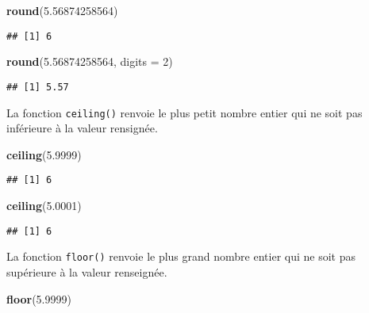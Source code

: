 \documentclass[]{book}
\newenvironment{Shaded}{\begin{snugshade}}{\end{snugshade}}
\newcommand{\KeywordTok}[1]{\textcolor[rgb]{0.13,0.29,0.53}{\textbf{#1}}}
\newcommand{\DataTypeTok}[1]{\textcolor[rgb]{0.13,0.29,0.53}{#1}}
\newcommand{\DecValTok}[1]{\textcolor[rgb]{0.00,0.00,0.81}{#1}}
\newcommand{\FloatTok}[1]{\textcolor[rgb]{0.00,0.00,0.81}{#1}}
\newcommand{\NormalTok}[1]{#1}
\theoremstyle{definition}
\theoremstyle{definition}
\theoremstyle{definition}
\theoremstyle{remark}
\begin{document}
\begin{Shaded}
\begin{Highlighting}[]
\KeywordTok{round}\NormalTok{(}\FloatTok{5.56874258564}\NormalTok{)}
\end{Highlighting}
\end{Shaded}

\begin{verbatim}
## [1] 6
\end{verbatim}

\begin{Shaded}
\begin{Highlighting}[]
\KeywordTok{round}\NormalTok{(}\FloatTok{5.56874258564}\NormalTok{, }\DataTypeTok{digits =} \DecValTok{2}\NormalTok{)}
\end{Highlighting}
\end{Shaded}

\begin{verbatim}
## [1] 5.57
\end{verbatim}

La fonction \texttt{ceiling()} renvoie le plus petit nombre entier qui
ne soit pas inférieure à la valeur rensignée.

\begin{Shaded}
\begin{Highlighting}[]
\KeywordTok{ceiling}\NormalTok{(}\FloatTok{5.9999}\NormalTok{)}
\end{Highlighting}
\end{Shaded}

\begin{verbatim}
## [1] 6
\end{verbatim}

\begin{Shaded}
\begin{Highlighting}[]
\KeywordTok{ceiling}\NormalTok{(}\FloatTok{5.0001}\NormalTok{)}
\end{Highlighting}
\end{Shaded}

\begin{verbatim}
## [1] 6
\end{verbatim}

La fonction \texttt{floor()} renvoie le plus grand nombre entier qui ne
soit pas supérieure à la valeur renseignée.

\begin{Shaded}
\begin{Highlighting}[]
\KeywordTok{floor}\NormalTok{(}\FloatTok{5.9999}\NormalTok{)}
\end{Highlighting}
\end{Shaded}
\end{document}
